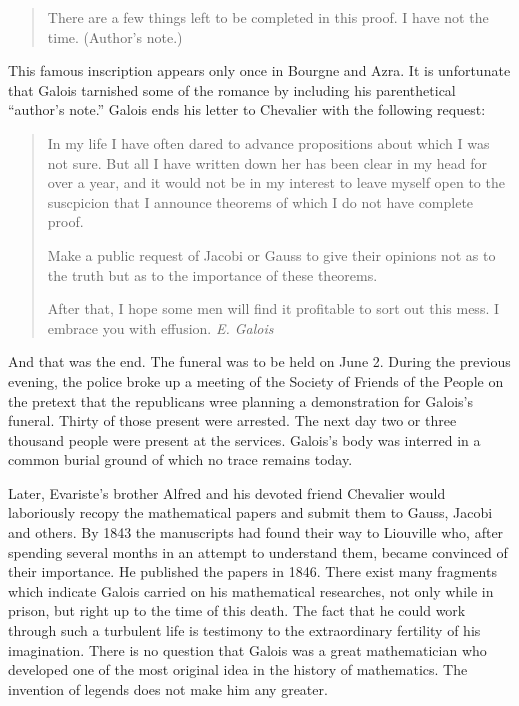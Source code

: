\documentclass[12pt]{article}
\begin{document}
\begin{quote}
There are a few things left to be completed in this proof. I have not the time. (Author's note.)
\end{quote}
This famous inscription appears only once in Bourgne and Azra. It is unfortunate that Galois tarnished some of the romance by including his parenthetical ``author's note.'' Galois ends his letter to Chevalier with the following request:

\begin{quotation}

In my life I have often dared to advance propositions about which I was not sure. But all I have written down her has been clear in my head for over a year, and it would not be in my interest to leave myself open to the suscpicion that I announce theorems of which I do not have complete proof. 

Make a public request of Jacobi or Gauss to give their opinions not as to the truth but as to the importance of these theorems. 

After that, I hope some men will find it profitable to sort out this mess. 
I embrace you with effusion. {\it E. Galois}
\end{quotation}
And that was the end. The funeral was to be held on June 2. During the previous evening, the police broke up a meeting of the Society of Friends of the People on the pretext that the republicans wree planning a demonstration for Galois's funeral. Thirty of those present were arrested. The next day two or three thousand people were present at the services. Galois's body was interred in a common burial ground of which no trace remains today.

Later, Evariste's brother Alfred and his devoted friend Chevalier would laboriously recopy the mathematical papers and submit them to Gauss, Jacobi and others. By 1843 the manuscripts had found their way to Liouville who, after spending several months in an attempt to understand them, became convinced of their importance. He published the papers in 1846. There exist many fragments which indicate Galois carried on his mathematical researches, not only while in prison, but right up to the time of this death. The fact that he could work through such a turbulent life is testimony to the extraordinary fertility of his imagination. There is no question that Galois was a great mathematician who developed one of the most original idea in the history of mathematics. The invention of legends does not make him any greater.
\end{document}
